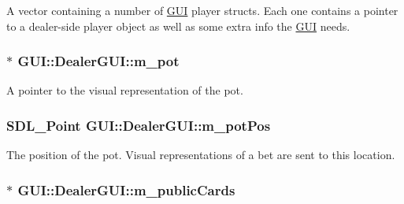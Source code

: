 A vector containing a number of \hyperlink{namespaceGUI}{G\-U\-I} player structs. Each one contains a pointer to a dealer-\/side player object as well as some extra info the \hyperlink{namespaceGUI}{G\-U\-I} needs. 

\hypertarget{classGUI_1_1DealerGUI_a9292267bd8cf7df3e997936304258855}{
\subsubsection[{m\-\_\-pot}]{$\ast$ G\-U\-I\-::\-Dealer\-G\-U\-I\-::m\-\_\-pot\hspace{0.3cm}{\ttfamily [private]}}}\label{classGUI_1_1DealerGUI_a9292267bd8cf7df3e997936304258855}


A pointer to the visual representation of the pot. 

\hypertarget{classGUI_1_1DealerGUI_a4084246f33414f6c1e882fdb8c288746}{
\subsubsection[{m\-\_\-pot\-Pos}]{\setlength{\rightskip}{0pt plus 5cm}S\-D\-L\-\_\-\-Point G\-U\-I\-::\-Dealer\-G\-U\-I\-::m\-\_\-pot\-Pos\hspace{0.3cm}{\ttfamily [private]}}}\label{classGUI_1_1DealerGUI_a4084246f33414f6c1e882fdb8c288746}


The position of the pot. Visual representations of a bet are sent to this location. 

\hypertarget{classGUI_1_1DealerGUI_a3f31e18b4139bd25499b4b947bfdfa00}{
\subsubsection[{m\-\_\-public\-Cards}]{$\ast$ G\-U\-I\-::\-Dealer\-G\-U\-I\-::m\-\_\-public\-Cards}}\label{classGUI_1_1DealerGUI_a3f31e18b4139bd25499b4b947bfdfa00}


